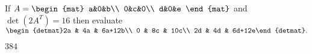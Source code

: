 
\begin{Exercise}[
name={},
title={}, 
difficulty=0,
origin={\cite{YL}}]
If
$
A=\begin{mat}
a&0&b\\
0&c&0\\
d&0&e
\end{mat}
$
and $\det(2A^T)=16$ then evaluate
$
\begin{detmat}2a & 4a & 6a+12b\\ 0 & 8c & 10c\\ 2d & 4d & 6d+12e\end{detmat}.
$
\end{Exercise}

\begin{Answer}
$
384
$
\end{Answer}
